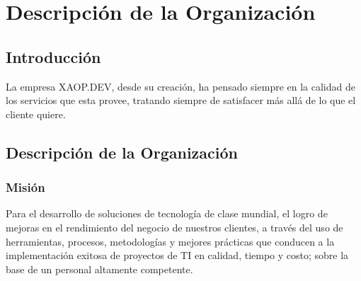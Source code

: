 \chapter{Descripción de la Organización}

\section{Introducción}
La empresa XAOP.DEV, desde su creación, ha pensado siempre en la calidad de los servicios que esta provee, tratando siempre de satisfacer más allá de lo que el cliente quiere.

\section{Descripción de la Organización}

\subsection{Misión}
Para el desarrollo de soluciones de tecnología de clase mundial, el logro de mejoras en el rendimiento del negocio de nuestros clientes, a través del uso de herramientas, procesos, metodologías y mejores prácticas que conducen a la implementación exitosa de proyectos de TI en calidad, tiempo y costo; sobre la base de un personal altamente competente.
